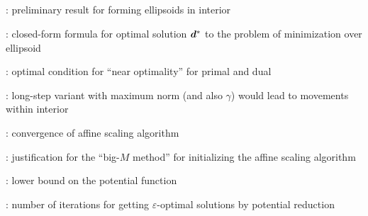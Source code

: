 \subsection*{}
\item {}: preliminary result for forming ellipsoids in interior
\item {}: closed-form formula for optimal
solution \(\bm{d}^{*}\) to the problem of minimization over ellipsoid
\item {}: optimal condition for ``near
optimality'' for primal and dual
\item {}: long-step variant with maximum
norm (and also \(\gamma\)) would lead to movements within interior
\item {}: convergence of affine scaling algorithm
\item {}: justification for the ``big-\(M\) method'' for initializing the affine scaling algorithm
\item {}: lower bound on the potential function
\item {}: number of iterations for getting \(\varepsilon\)-optimal solutions by potential reduction
